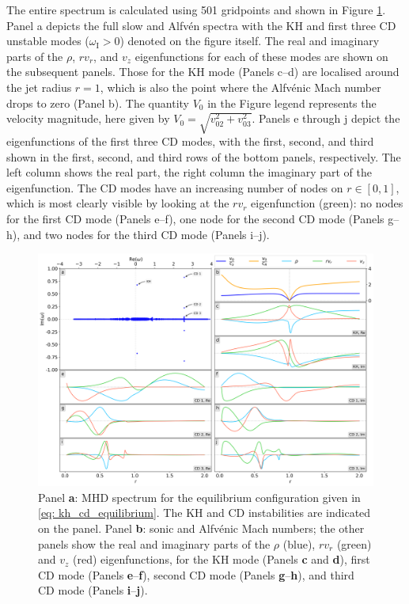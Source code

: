 The entire spectrum is calculated using 501 gridpoints and shown in Figure \ref{fig: kh_cd}. Panel a depicts the full slow and Alfv\'en spectra with the KH and first three CD unstable modes ($\omega_\text{I} > 0$) denoted on the figure itself. The real and imaginary parts of the $\rho$, $r v_r$, and $v_z$ eigenfunctions for each of these modes are shown on the subsequent panels. Those for the KH mode (Panels c--d) are localised around the jet radius $r = 1$, which is also the point where the Alfv\'enic Mach number drops to zero (Panel b). The quantity $V_0$ in the Figure legend represents the velocity magnitude, here given by $V_0 = \sqrt{v_{02}^2 + v_{03}^2}$. Panels e through j depict the eigenfunctions of the first three CD modes, with the first, second, and third shown in the first, second, and third rows of the bottom panels, respectively. The left column shows the real part, the right column the imaginary part of the eigenfunction. The CD modes have an increasing number of nodes on $r \in [0, 1]$, which is most clearly visible by looking at the
$r v_r$ eigenfunction (green): no nodes for the first CD mode (Panels e--f), one node for the second CD mode (Panels g--h), and two nodes for the third CD mode (Panels i--j).

\begin{figure}[t]
  \centering
  \includegraphics[width=\textwidth]{kh_cd.png}
  \caption{
    Panel \textbf{a}: MHD spectrum for the equilibrium configuration given in \eqref{eq: kh_cd_equilibrium}. The KH and CD instabilities are indicated on the panel. Panel \textbf{b}: sonic and Alfv\'enic Mach numbers; the other panels show the real and imaginary parts of the $\rho$ (blue), $r v_r$ (green) and $v_z$ (red) eigenfunctions, for the KH mode (Panels \textbf{c} and \textbf{d}), first CD mode (Panels \textbf{e}--\textbf{f}), second CD mode (Panels \textbf{g}--\textbf{h}), and third CD mode (Panels \textbf{i}--\textbf{j}).
  }
  \label{fig: kh_cd}
\end{figure}

